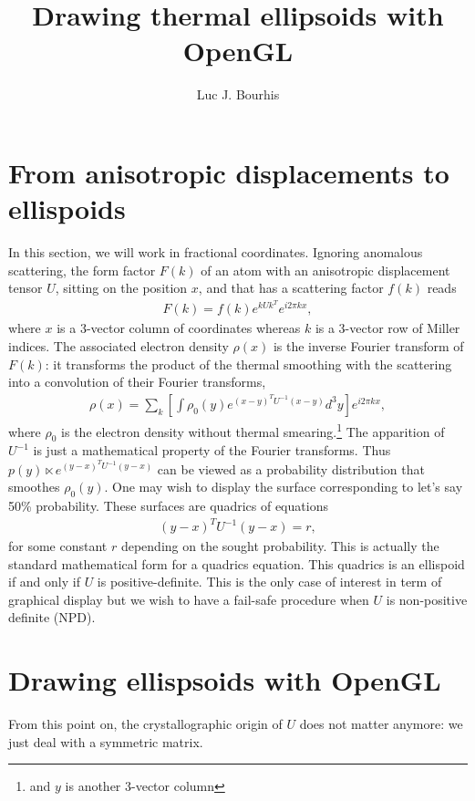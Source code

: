 \documentclass[a4paper,11pt]{article}
\title{Drawing thermal ellipsoids with OpenGL}
\author{Luc J. Bourhis}
\begin{document}
\maketitle

\section{From anisotropic displacements to ellispoids}
In this section, we will work in fractional coordinates.
Ignoring anomalous scattering, the form factor $F(k)$ of an atom with an anisotropic displacement tensor $U$, sitting on the position $x$, and that has a scattering factor $f(k)$ reads
\begin{align}
  F(k) = f(k) e^{k U k^T} e^{i 2\pi k x},
\end{align}
where $x$ is a 3-vector column of coordinates whereas $k$ is a 3-vector row of Miller indices. The associated electron density $\rho(x)$ is the inverse Fourier transform of $F(k)$: it transforms the product of the thermal smoothing with the scattering into a convolution of their Fourier transforms,
\begin{align}
  \rho(x) = \sum_k \left[\int \rho_0(y) e^{(x-y)^T U^{-1} (x-y)} d^3y 
  \right] e^{i 2\pi k x},
\end{align}
where $\rho_0$ is the electron density without thermal smearing.\footnote{and $y$ is another 3-vector column} The apparition of $U^{-1}$ is just a mathematical property of the Fourier transforms. Thus $p(y) \ltimes e^{(y-x)^T U^{-1} (y-x)}$ can be viewed as a probability distribution that smoothes $\rho_0(y)$. One may wish to display the surface corresponding to let's say 50\% probability. These surfaces are quadrics of equations
\begin{align}
  (y-x)^T U^{-1} (y-x) = r,
  \label{quadrics}
\end{align}
for some constant $r$ depending on the sought probability. This is actually the standard mathematical form for a quadrics equation. This quadrics is an ellispoid if and only if $U$ is positive-definite. This is the only case of interest in term of graphical display but we wish to have a fail-safe procedure when $U$ is non-positive definite (NPD).

\section{Drawing ellispsoids with OpenGL}

From this point on, the crystallographic origin of $U$ does not matter anymore: we just deal with a symmetric matrix.
\end{document}
